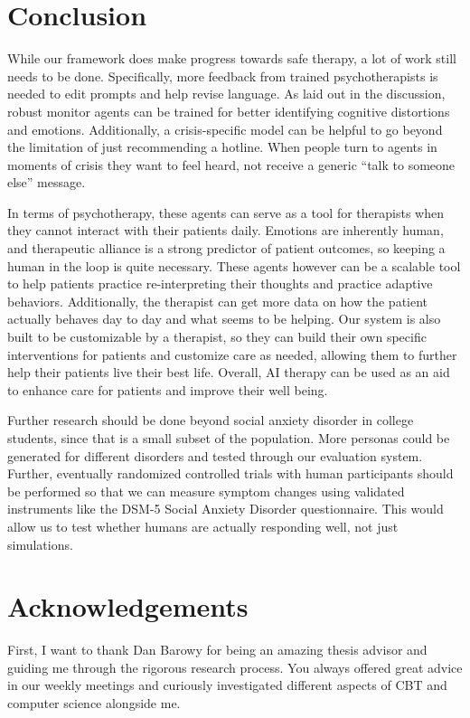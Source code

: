 \documentclass[twoside]{report}
\begin{document}
\chapter{Conclusion}
While our framework does make progress towards safe therapy, a lot of work still needs to be done. Specifically, more feedback from trained psychotherapists is needed to edit prompts and help revise language. As laid out in the discussion, robust monitor agents can be trained for better identifying cognitive distortions and emotions. Additionally, a crisis-specific model can be helpful to go beyond the limitation of just recommending a hotline. When people turn to agents in moments of crisis they want to feel heard, not receive a generic ``talk to someone else'' message.

In terms of psychotherapy, these agents can serve as a tool for therapists when they cannot interact with their patients daily. Emotions are inherently human, and therapeutic alliance is a strong predictor of patient outcomes, so keeping a human in the loop is quite necessary. These agents however can be a scalable tool to help patients practice re-interpreting their thoughts and practice adaptive behaviors. Additionally, the therapist can get more data on how the patient actually behaves day to day and what seems to be helping. Our system is also built to be customizable by a therapist, so they can build their own specific interventions for patients and customize care as needed, allowing them to further help their patients live their best life. Overall, AI therapy can be used as an aid to enhance care for patients and improve their well being.

Further research should be done beyond social anxiety disorder in college students, since that is a small subset of the population. More personas could be generated for different disorders and tested through our evaluation system. Further, eventually randomized controlled trials with human participants should be performed so that we can measure symptom changes using validated instruments like the DSM-5 Social Anxiety Disorder questionnaire. This would allow us to test whether humans are actually responding well, not just simulations.

\chapter{Acknowledgements}
First, I want to thank Dan Barowy for being an amazing thesis advisor and guiding me through the rigorous research process. You always offered great advice in our weekly meetings and curiously investigated different aspects of CBT and computer science alongside me.
\end{document}
